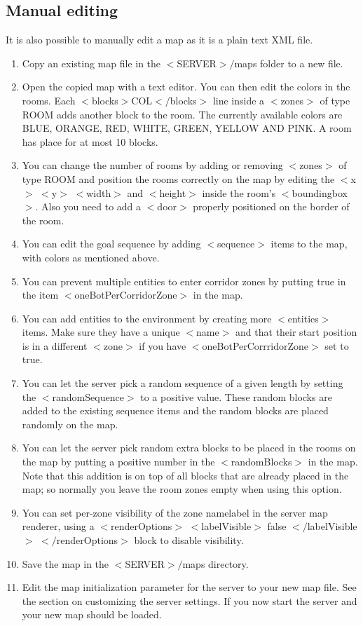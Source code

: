 \documentclass[11pt,a4paper]{article}
\begin{document}
\subsection{Manual editing}
It is also possible to manually edit a map as it is a plain text XML file.
\begin{enumerate}
\item Copy an existing map file in the $<$SERVER$>/$maps folder to a new file.
\item Open the copied map with a text editor. You can then edit the colors in the rooms. Each $<$blocks$>$COL$</$blocks$>$ line inside a $<$zones$>$ of type ROOM adds another block to the room. The currently available colors are BLUE, ORANGE, RED, WHITE, GREEN, YELLOW AND PINK. A room has place for at most 10 blocks.
\item You can change the number of rooms by adding or removing $<$zones$>$ of type ROOM and position the rooms correctly on the map by editing the $<$x$>$ $<$y$>$ $<$width$>$ and $<$height$>$ inside the room's $<$boundingbox$>$. Also you need to add a $<$door$>$ properly positioned on the border of the room.
\item You can edit the goal sequence by adding $<$sequence$>$ items to the map, with colors as mentioned above.
\item You can prevent multiple entities to enter corridor zones by putting true in the item $<$oneBotPerCorridorZone$>$ in the map.
\item You can add entities to the environment by creating more $<$entities$>$ items. Make sure they have a unique $<$name$>$ and that their start position is in a different $<$zone$>$ if you have $<$oneBotPerCorrridorZone$>$ set to true.
\item You can let the server pick a random sequence of a given length by setting the $<$randomSequence$>$ to a positive value. These random blocks are added to the existing sequence items and the random blocks are placed randomly on the map.
\item You can let the server pick random extra blocks to be placed in the rooms on the map by putting a positive number in the $<$randomBlocks$>$ in the map. Note that this addition is on top of all blocks that are already placed in the map; so normally you leave the room zones empty when using this option.
\item You can set per-zone visibility of the zone namelabel in the server map renderer, using a $<$renderOptions$>$ $<$labelVisible$>$ false $</$labelVisible$>$ $</$renderOptions$>$ block to disable visibility.
\item Save the map in the $<$SERVER$>/$maps directory.
\item Edit the map initialization parameter for the server to your new map file. See the section on customizing the server settings. If you now start the server and your new map should be loaded.
\end{enumerate}
\end{document}
